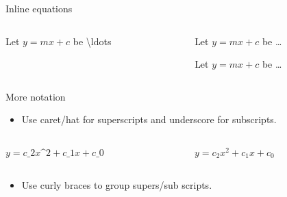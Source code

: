 \documentclass[,aspectratio=43]{beamer}
\newenvironment{Shaded}{\begin{snugshade}}{\end{snugshade}}
\newcommand{\FunctionTok}[1]{\textcolor[rgb]{0.02,0.16,0.49}{#1}}
\newcommand{\NormalTok}[1]{#1}
\newcommand{\SpecialStringTok}[1]{\textcolor[rgb]{0.73,0.40,0.53}{#1}}
\providecommand{\tightlist}{%
  \setlength{\itemsep}{0pt}\setlength{\parskip}{0pt}}
\begin{document}
\begin{frame}[fragile]{Inline equations}
\begin{columns}[T]
\begin{column}{0.48\textwidth}
\begin{Shaded}
\begin{Highlighting}[]
\NormalTok{Let }\SpecialStringTok{$y = m x + c$}\NormalTok{ be }\FunctionTok{\textbackslash{}ldots}
\end{Highlighting}
\end{Shaded}
\end{column}

\begin{column}{0.48\textwidth}
Let \(y=mx+c\) be \ldots

\vspace{1.2em}

Let \(y = m x + c\) be \ldots
\end{column}
\end{columns}
\end{frame}

\begin{frame}[fragile]{More notation}
\protect\hypertarget{more-notation}{}
\begin{itemize}
\tightlist
\item
  Use caret/hat \framebox{\ \texttt{\^}} for superscripts and underscore
  \framebox{$\vphantom{a}$\texttt{\_}} for subscripts.
\end{itemize}

\begin{columns}[T]
\begin{column}{0.58\textwidth}
\small
\vspace{-1em}

\begin{Shaded}
\begin{Highlighting}[]
\SpecialStringTok{$y = c\_2 x\^{}2 + c\_1 x + c\_0$}
\end{Highlighting}
\end{Shaded}
\end{column}

\begin{column}{0.38\textwidth}
\(y = c_2 x^2 + c_1 x + c_0\)
\end{column}
\end{columns}

\vspace{0.5em}

\begin{itemize}
\tightlist
\item
  Use curly braces \framebox{\texttt{\{}} \framebox{\texttt{\}}} to
  group supers/sub scripts.
\end{itemize}

\begin{columns}[T]
\begin{column}{0.58\textwidth}
\small
\vspace{-1em}


\end{column}
\end{columns}
\end{frame}
\end{document}
